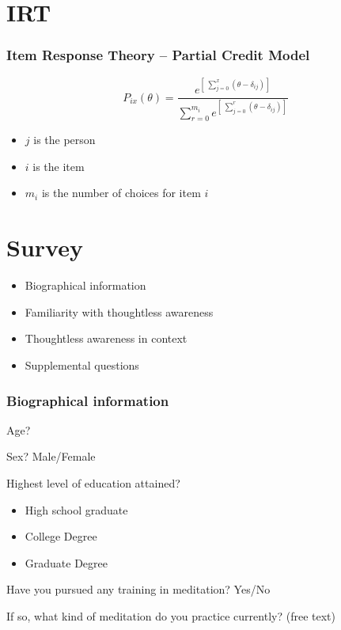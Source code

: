 \documentclass[10pt,utf8x]{beamer}
\begin{document}
\section{IRT}
\begin{frame}
  \frametitle{Item Response Theory -- Partial Credit Model}

\begin{displaymath}
P_{ix}(\theta) =
\frac{e^{\left[\ \displaystyle\sum_{j=0}^{x} (\theta - \delta_{ij})\right]}}
{\displaystyle\sum_{r=0}^{m_i}
e^{\left[\ \displaystyle\sum_{j=0}^{r}(\theta - \delta_{ij})\right]}}
\end{displaymath}

\begin{itemize}
\item $j$ is the person
\item $i$ is the item
\item $m_i$ is the number of choices for item $i$
\end{itemize}
\end{frame}

\section{Survey}
\begin{frame}
\begin{itemize}
\item Biographical information
\item Familiarity with thoughtless awareness
\item Thoughtless awareness in context
\item Supplemental questions
\end{itemize}
\end{frame}

\begin{frame}
  \frametitle{Biographical information}
Age?

Sex? Male/Female

Highest level of education attained?
\begin{itemize}
\item High school graduate
\item College Degree
\item Graduate Degree
\end{itemize}

Have you pursued any training in meditation? Yes/No

If so, what kind of meditation do you practice currently? (free text)
\end{frame}
\end{document}
